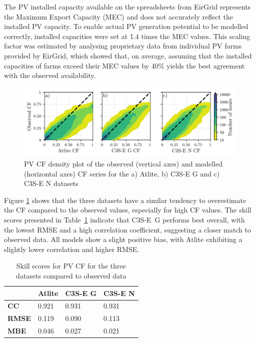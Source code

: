 \documentclass[preprint, 12pt]{elsarticle}
\begin{document}
The PV installed capacity available on the spreadsheets from EirGrid represents the Maximum Export Capacity (MEC) and does not accurately reflect the installed PV capacity. To enable actual PV generation potential to be modelled correctly, installed capacities were set at 1.4 times the MEC values. This scaling factor was estimated by analysing proprietary data from individual PV farms provided by EirGrid, which showed that, on average, assuming that the installed capacities of farms exceed their MEC values by 40\% yields the best agreement with the observed availability.

\begin{figure}[h!]
	\centering
	\includegraphics[width=\textwidth]{verification_pv_contour.png}
	\caption{PV CF density plot of the observed (vertical axes) and modelled (horizontal axes) CF series for the a) Atlite, b) C3S-E G and c) C3S-E N datasets}	
	\label{fig:solar_verification_contour}
\end{figure}

Figure \ref{fig:solar_verification_contour} shows that the three datasets have a similar tendency to overestimate the CF compared to the observed values, especially for high CF values. The skill scores presented in Table~\ref{tab:pv_skill_scores} indicate that C3S-E~G performs best overall, with the lowest RMSE and a high correlation coefficient, suggesting a closer match to observed data. All models show a slight positive bias, with Atlite exhibiting a slightly lower correlation and higher RMSE.

\begin{table}[!ht]
	\centering
	\begin{tabular}{l|lll|}
		\cline{2-4}
		& \textbf{Atlite} & \textbf{C3S-E G} & \textbf{C3S-E N} \\ \hline
		\multicolumn{1}{|l|}{\textbf{CC}}   & 0.921           & 0.931            & 0.931            \\ \hline
		\multicolumn{1}{|l|}{\textbf{RMSE}} & 0.119           & 0.090            & 0.113            \\ \hline
		\multicolumn{1}{|l|}{\textbf{MBE}}   & 0.046           & 0.027           & 0.021           \\ \hline
	\end{tabular}
	\caption{Skill scores for PV CF for the three datasets compared to observed data}
	\label{tab:pv_skill_scores}
\end{table}
\end{document}
